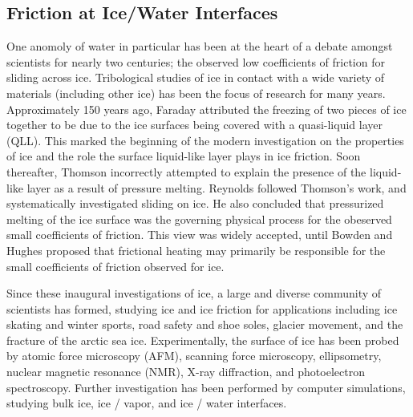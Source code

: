 \subsection{Friction at Ice/Water Interfaces}
%
One anomoly of water in particular has been at the heart of a debate
amongst scientists for nearly two centuries; the observed low
coefficients of friction for sliding across ice.  Tribological studies of
ice in contact with a wide variety of materials (including other ice)
has been the focus of research for many years.  Approximately 150
years ago, Faraday attributed the freezing of two pieces of ice
together to be due to the ice surfaces being covered with a
quasi-liquid layer (QLL).\cite{Faraday1859} This marked the beginning
of the modern investigation on the properties of ice and the role the
surface liquid-like layer plays in ice friction. Soon thereafter,
Thomson incorrectly attempted to explain the presence of the
liquid-like layer as a result of pressure melting.\cite{Thomson1859}
Reynolds followed Thomson's work, and systematically investigated
sliding on ice. He also concluded that pressurized melting of the ice
surface was the governing physical process for the obeserved small
coefficients of friction.\cite{Reynolds1901} This view was widely
accepted, until Bowden and Hughes proposed that frictional heating may
primarily be responsible for the small coefficients of friction
observed for ice.\cite{Bowden1939}

Since these inaugural investigations of ice, a large and diverse
community of scientists has formed, studying ice and ice friction
for applications including ice skating and winter 
sports\cite{Rosenberg2005,Kietzig2010}, 
road safety and shoe soles\cite{Roberts1981,Higgins2008}, 
glacier movement\cite{Casassa1991, Sukhorukov2013, Pritchard2012},
and the fracture of the arctic sea 
ice\cite{Schulson2004,Weiss2007,Feltham2008,Lishman2011,Lishman2013}.  
Experimentally, the surface of ice has been probed by atomic force
microscopy
(AFM)\cite{Doppenschmidt1998,Bluhm1999,Bluhm2000}, scanning force
microscopy\cite{Bluhm1998}, ellipsometry\cite{Beaglehole1980,Beaglehole1993},
nuclear magnetic resonance (NMR)\cite{Ishizaki1996}, X-ray 
diffraction\cite{Dosch1996}, and photoelectron
spectroscopy\cite{Bluhm2002}. Further investigation has been performed by
computer simulations, studying bulk 
ice\cite{Kerr1988,Tse1988,Hayward1997,Gao2000,Rick2005,Dong2001,Weber1983,Wang2005,Kuo2005,Buch1998,Rick2001,Gay2002}, 
ice / vapor\cite{Kroes1992,Devlin1995,Ikeda-Fukazawa2004,Picaud2006,Conde2008,Pereyra2009},
and ice / water\cite{Baez1995,Bryk2002,Bryk2004,Bryk2004a,Gao2000,GarciaFernandez2006,Hayward2002,Hayward2001,Karim1988,Karim1987,Karim1990,Louden2013,Nada1997,NadaH.andFurukawa1995,Nada1996,Nada2000,Nada1997a} interfaces. 


